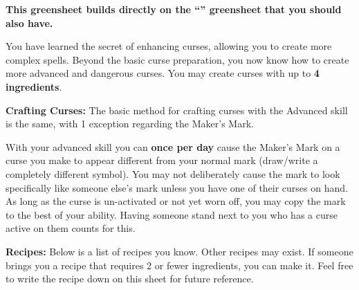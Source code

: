 \documentclass[green]{GL2020}
\begin{document}
\name{\gCursemakingAdvanced{}}

\textbf{This greensheet builds directly on the ``\gCursemakingBasic{}'' greensheet that you should also have.}

You have learned the secret of enhancing curses, allowing you to create more complex spells. Beyond the basic curse preparation, you now know how to create more advanced and dangerous curses. You may create curses with up to\textbf{ 4 ingredients}.


\textbf{Crafting Curses:}
The basic method for crafting curses with the Advanced skill is the same, with 1 exception regarding the Maker’s Mark.

With your advanced skill you can \textbf{once per day} cause the Maker’s Mark on a curse you make to appear different from your normal mark (draw/write a completely different symbol). You may not deliberately cause the mark to look specifically like someone else’s mark unless you have one of their curses on hand. As long as the curse is un-activated or not yet worn off, you may copy the mark to the best of your ability. Having someone stand next to you who has a curse active on them counts for this.

\textbf{Recipes:}
Below is a list of recipes you know. Other recipes may exist. If someone brings you a recipe that requires 2 or fewer ingredients, you can make it. Feel free to write the recipe down on this sheet for future reference.
\end{document}
